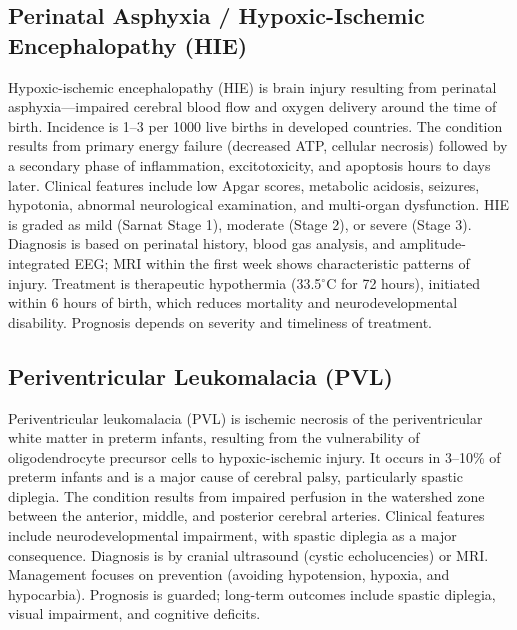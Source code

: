 \subsection{Perinatal Asphyxia / Hypoxic-Ischemic Encephalopathy (HIE)}
\label{sec:Hypoxic-Ischemic Encephalopathy}
Hypoxic-ischemic encephalopathy (HIE) is brain injury resulting from perinatal asphyxia---impaired cerebral blood flow and oxygen delivery around the time of birth. Incidence is 1--3 per 1000 live births in developed countries. The condition results from primary energy failure (decreased ATP, cellular necrosis) followed by a secondary phase of inflammation, excitotoxicity, and apoptosis hours to days later. Clinical features include low Apgar scores, metabolic acidosis, seizures, hypotonia, abnormal neurological examination, and multi-organ dysfunction. HIE is graded as mild (Sarnat Stage 1), moderate (Stage 2), or severe (Stage 3). Diagnosis is based on perinatal history, blood gas analysis, and amplitude-integrated EEG; MRI within the first week shows characteristic patterns of injury. Treatment is therapeutic hypothermia (33.5$^\circ$C for 72 hours), initiated within 6 hours of birth, which reduces mortality and neurodevelopmental disability. Prognosis depends on severity and timeliness of treatment.

\subsection{Periventricular Leukomalacia (PVL)}
\label{sec:Periventricular Leukomalacia}
Periventricular leukomalacia (PVL) is ischemic necrosis of the periventricular white matter in preterm infants, resulting from the vulnerability of oligodendrocyte precursor cells to hypoxic-ischemic injury. It occurs in 3--10\% of preterm infants and is a major cause of cerebral palsy, particularly spastic diplegia. The condition results from impaired perfusion in the watershed zone between the anterior, middle, and posterior cerebral arteries. Clinical features include neurodevelopmental impairment, with spastic diplegia as a major consequence. Diagnosis is by cranial ultrasound (cystic echolucencies) or MRI. Management focuses on prevention (avoiding hypotension, hypoxia, and hypocarbia). Prognosis is guarded; long-term outcomes include spastic diplegia, visual impairment, and cognitive deficits.

